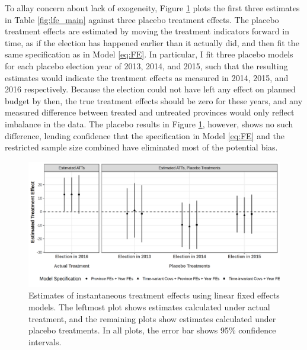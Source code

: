 \documentclass[12pt]{article}
\newcommand{\1}{\mathbbm{1}}
\begin{document}
To allay concern about lack of exogeneity, Figure \ref{fig:lfe_placebo} plots the first three estimates in Table \ref{fig:lfe_main} against three placebo treatment effects. The placebo treatment effects are estimated by moving the treatment indicators forward in time, as if the election has happened earlier than it actually did, and then fit the same specification as in Model \eqref{eq:FE}. In particular, I fit three placebo models for each placebo election year of 2013, 2014, and 2015, such that the resulting estimates would indicate the treatment effects as measured in 2014, 2015, and 2016 respectively. Because the election could not have left any effect on planned budget by then, the true treatment effects should be zero for these years, and any measured difference between treated and untreated provinces would only reflect imbalance in the data. The placebo results in Figure \ref{fig:lfe_placebo}, however, shows no such difference, lending confidence that the specification in Model \eqref{eq:FE} and the restricted sample size combined have eliminated most of the potential bias.


\begin{figure}[!htbp]
	\centering
	\includegraphics[width=\textwidth]{figure/190311_lfe_placebo.png}
	\captionsetup{singlelinecheck=off}
	\caption[Estimated placebo linear fixed effects treatment effects]{Estimates of instantaneous treatment effects using linear fixed effects models. The leftmost plot shows estimates calculated under actual treatment, and the remaining plots show estimates calculated under placebo treatments. In all plots, the error bar shows 95\% confidence intervals.}
	\label{fig:lfe_placebo}
\end{figure}
\end{document}
